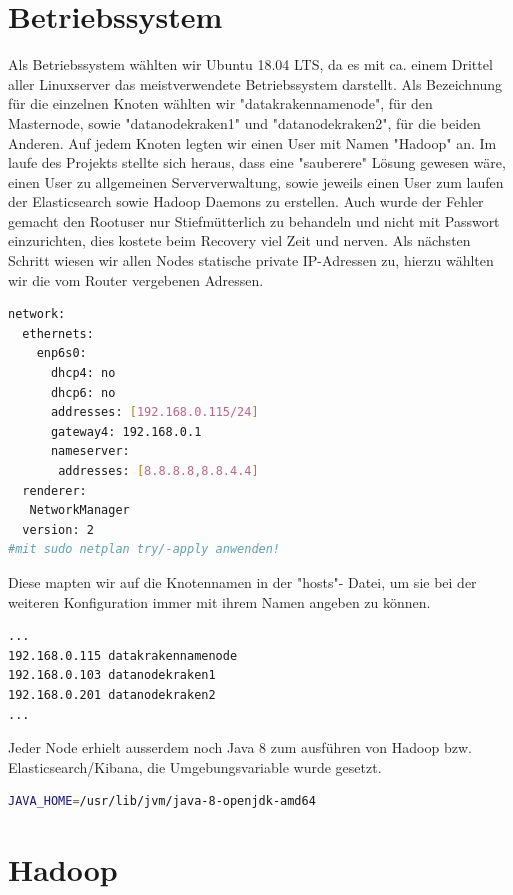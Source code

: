 \documentclass[12pt,oneside,a4paper,parskip]{scrbook}
\begin{document}
\section{Betriebssystem} Als Betriebssystem wählten wir Ubuntu 18.04 LTS, da es mit ca. einem Drittel aller Linuxserver das meistverwendete Betriebssystem darstellt. Als Bezeichnung für die einzelnen Knoten wählten wir "datakrakennamenode", für den Masternode, sowie "datanodekraken1" und "datanodekraken2", für die beiden Anderen. Auf jedem Knoten legten wir einen User mit Namen "Hadoop" an. Im laufe des Projekts stellte sich heraus, dass eine "sauberere" Lösung gewesen wäre, einen User zu allgemeinen Serververwaltung, sowie jeweils einen User zum laufen der Elasticsearch sowie Hadoop Daemons zu erstellen. Auch wurde der Fehler gemacht den Rootuser nur Stiefmütterlich zu behandeln und nicht mit Passwort einzurichten, dies kostete beim Recovery viel Zeit und nerven.\newline
Als nächsten Schritt wiesen wir allen Nodes statische private IP-Adressen zu, hierzu wählten wir die vom Router vergebenen Adressen. \pagebreak
\begin{lstlisting}[caption=datakrakennamenode: /etc/netplan/00-installer-config.yaml,label=hosts,language=bash]
network:
  ethernets:
    enp6s0:
      dhcp4: no
      dhcp6: no
      addresses: [192.168.0.115/24]
      gateway4: 192.168.0.1
      nameserver:
       addresses: [8.8.8.8,8.8.4.4]
  renderer:
   NetworkManager
  version: 2
#mit sudo netplan try/-apply anwenden!
\end{lstlisting}
Diese mapten wir auf die Knotennamen in der "hosts"- Datei, um sie bei der weiteren Konfiguration immer mit ihrem Namen angeben zu können.
\begin{lstlisting}[caption=etc/hosts,label=hosts,language=bash]
...
192.168.0.115 datakrakennamenode
192.168.0.103 datanodekraken1
192.168.0.201 datanodekraken2
...
\end{lstlisting}
Jeder Node erhielt ausserdem noch Java 8 zum ausführen von Hadoop bzw. Elasticsearch/Kibana, die Umgebungsvariable wurde gesetzt.
\begin{lstlisting}[caption=etc/environment,label=javaenv,language=bash]
JAVA_HOME=/usr/lib/jvm/java-8-openjdk-amd64
\end{lstlisting}

\section{Hadoop}
\end{document}
